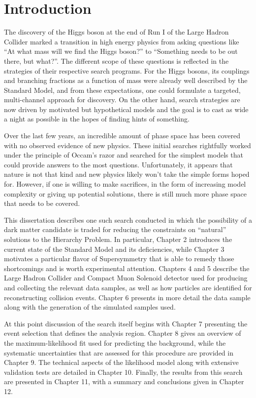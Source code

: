 \chapter{Introduction}

The discovery of the Higgs boson at the end of Run I of the Large Hadron Collider marked a transition in high energy physics from asking questions like ``At what mass will we find the Higgs boson?'' to ``Something needs to be out there, but what?''.
The different scope of these questions is reflected in the strategies of their respective search programs.
For the Higgs bosons, its couplings and branching fractions as a function of mass were already well described by the Standard Model, and from these expectations, one could formulate a targeted, multi-channel approach for discovery.
On the other hand, search strategies are now driven by motivated but hypothetical models and the goal is to cast as wide a night as possible in the hopes of finding hints of something.

Over the last few years, an incredible amount of phase space has been covered with no observed evidence of new physics.
These initial searches rightfully worked under the principle of Occam's razor and searched for the simplest models that could provide answers to the most questions.
Unfortunately, it appears that nature is not that kind and new physics likely won't take the simple forms hoped for.
However, if one is willing to make sacrifices, in the form of increasing model complexity or giving up potential solutions, there is still much more phase space that needs to be covered. 

This dissertation describes one such search conducted in which the possibility of a dark matter candidate is traded for reducing the constraints on ``natural'' solutions to the Hierarchy Problem.
In particular, Chapter 2 introduces the current state of the Standard Model and its deficiencies, while Chapter 3 motivates a particular flavor of Supersymmetry that is able to remedy those shortcomings and is worth experimental attention.
Chapters 4 and 5 describe the Large Hadron Collider and Compact Muon Solenoid detector used for producing and collecting the relevant data samples, as well as how particles are identified for reconstructing collision events.
Chapter 6 presents in more detail the data sample along with the generation of the simulated samples used.

At this point discussion of the search itself begins with Chapter 7 presenting the event selection that defines the analysis region.
Chapter 8 gives an overview of the maximum-likelihood fit used for predicting the background, while the systematic uncertainties that are assessed for this procedure are provided in Chapter 9.
The technical aspects of the likelihood model along with extensive validation tests are detailed in Chapter 10.
Finally, the results from this search are presented in Chapter 11, with a summary and conclusions given in Chapter 12.

